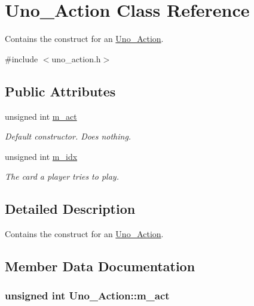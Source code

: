 \hypertarget{class_uno___action}{
\section{\-Uno\-\_\-\-Action \-Class \-Reference}
\label{class_uno___action}
}


\-Contains the construct for an \hyperlink{class_uno___action}{\-Uno\-\_\-\-Action}.  




{\ttfamily \#include $<$uno\-\_\-action.\-h$>$}

\subsection*{\-Public \-Attributes}
\begin{DoxyCompactItemize}
\item 
unsigned int \hyperlink{class_uno___action_a0e38e567ca993649d2513dd81c386677}{m\-\_\-act}
\begin{DoxyCompactList}\small\item\em \-Default constructor. \-Does nothing. \end{DoxyCompactList}\item 
unsigned int \hyperlink{class_uno___action_a228de2b5b030253562cadd34f21568c4}{m\-\_\-idx}
\begin{DoxyCompactList}\small\item\em \-The card a player tries to play. \end{DoxyCompactList}\end{DoxyCompactItemize}


\subsection{\-Detailed \-Description}
\-Contains the construct for an \hyperlink{class_uno___action}{\-Uno\-\_\-\-Action}. 

\subsection{\-Member \-Data \-Documentation}
\hypertarget{class_uno___action_a0e38e567ca993649d2513dd81c386677}{
\subsubsection[{m\-\_\-act}]{\setlength{\rightskip}{0pt plus 5cm}unsigned int {\bf \-Uno\-\_\-\-Action\-::m\-\_\-act}}}
\label{class_uno___action_a0e38e567ca993649d2513dd81c386677}


